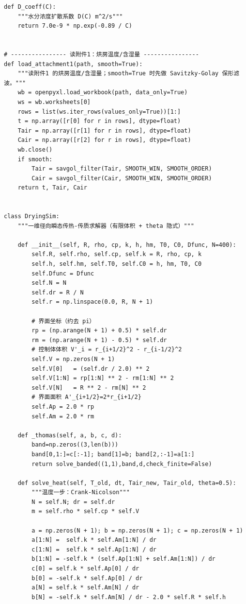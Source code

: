 \documentclass[12pt,a4paper]{ctexart}
\begin{document}
\begin{lstlisting}[caption={solve\_problem1.py }]
def D_coeff(C):
    """水分浓度扩散系数 D(C) m^2/s"""
    return 7.0e-9 * np.exp(-0.89 / C)


# ---------------- 读附件1：烘房温度/含湿量 ----------------
def load_attachment1(path, smooth=True):
    """读附件1 的烘房温度/含湿量；smooth=True 时先做 Savitzky-Golay 保形滤波。"""
    wb = openpyxl.load_workbook(path, data_only=True)
    ws = wb.worksheets[0]
    rows = list(ws.iter_rows(values_only=True))[1:] 
    t = np.array([r[0] for r in rows], dtype=float)
    Tair = np.array([r[1] for r in rows], dtype=float)
    Cair = np.array([r[2] for r in rows], dtype=float)
    wb.close()
    if smooth:
        Tair = savgol_filter(Tair, SMOOTH_WIN, SMOOTH_ORDER)
        Cair = savgol_filter(Cair, SMOOTH_WIN, SMOOTH_ORDER)
    return t, Tair, Cair


class DryingSim:
    """一维径向瞬态传热-传质求解器（有限体积 + theta 隐式）"""

    def __init__(self, R, rho, cp, k, h, hm, T0, C0, Dfunc, N=400):
        self.R, self.rho, self.cp, self.k = R, rho, cp, k
        self.h, self.hm, self.T0, self.C0 = h, hm, T0, C0
        self.Dfunc = Dfunc
        self.N = N
        self.dr = R / N
        self.r = np.linspace(0.0, R, N + 1)

        # 界面坐标（约去 pi）
        rp = (np.arange(N + 1) + 0.5) * self.dr
        rm = (np.arange(N + 1) - 0.5) * self.dr
        # 控制体体积 V'_i = r_{i+1/2}^2 - r_{i-1/2}^2
        self.V = np.zeros(N + 1)
        self.V[0]   = (self.dr / 2.0) ** 2
        self.V[1:N] = rp[1:N] ** 2 - rm[1:N] ** 2
        self.V[N]   = R ** 2 - rm[N] ** 2
        # 界面面积 A'_{i+1/2}=2*r_{i+1/2}
        self.Ap = 2.0 * rp
        self.Am = 2.0 * rm

    def _thomas(self, a, b, c, d):
        band=np.zeros((3,len(b)))
        band[0,1:]=c[:-1]; band[1]=b; band[2,:-1]=a[1:]
        return solve_banded((1,1),band,d,check_finite=False)

    def solve_heat(self, T_old, dt, Tair_new, Tair_old, theta=0.5):
        """温度一步：Crank-Nicolson"""
        N = self.N; dr = self.dr
        m = self.rho * self.cp * self.V

        a = np.zeros(N + 1); b = np.zeros(N + 1); c = np.zeros(N + 1)
        a[1:N] =  self.k * self.Am[1:N] / dr
        c[1:N] =  self.k * self.Ap[1:N] / dr
        b[1:N] = -self.k * (self.Ap[1:N] + self.Am[1:N]) / dr
        c[0] = self.k * self.Ap[0] / dr
        b[0] = -self.k * self.Ap[0] / dr
        a[N] = self.k * self.Am[N] / dr
        b[N] = -self.k * self.Am[N] / dr - 2.0 * self.R * self.h


\end{lstlisting}
\end{document}
